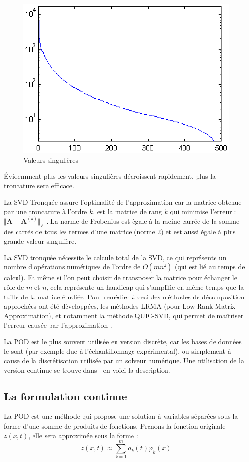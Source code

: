 \documentclass[12pt,a4paper]{report}
\begin{document}
\begin{figure}[!ht]
\centering
\includegraphics[width=0.425\linewidth]{Images/SVD/Valeurs.Singulieres.Semilog.eps}
\caption{Valeurs singulières}
\end{figure}

\label{ValeursSing}
Évidemment plus les valeurs singulières décroissent rapidement, plus la troncature sera efficace. 

La SVD Tronquée assure l'optimalité de l'approximation car la matrice obtenue par une troncature à l'ordre $k$, est la matrice de rang $k$ qui minimise l'erreur : $  \Vert \mathbf{A} - \mathbf{A}^{(k)} \Vert_F$ . La norme de Frobenius est égale à la racine carrée de la somme des carrés de tous les termes d'une matrice (norme 2) et est aussi égale à plus grande valeur singulière. 

La SVD tronquée nécessite le calcule total de la SVD, ce qui représente un nombre d'opérations numériques de l'ordre de $O(mn^2)$ (qui est lié au temps de calcul). Et même si l'on peut choisir de transposer la matrice pour échanger le rôle de $m$ et $n$, cela représente un handicap qui s'amplifie en même temps que la taille de la matrice étudiée. Pour remédier à ceci des méthodes de décomposition approchées ont été développées, les méthodes LRMA (pour Low-Rank Matrix Approximation), et notamment la méthode QUIC-SVD, qui permet de maîtriser l'erreur causée par l'approximation \cite{QUIC-SVD}. 

La POD est le plus souvent utilisée en version discrète, car les bases de données le sont (par exemple due à l'échantillonnage expérimental), ou simplement à cause de la discrétisation utilisée par un solveur numérique. Une utilisation de la version continue se trouve dans \cite{Turbulence}, en voici la description.

\subsection{La formulation continue}
La POD est une méthode qui propose une solution à variables séparées sous la forme d'une somme de produits de fonctions. Prenons la fonction originale $z(x,t)$, elle sera approximée sous la forme :
\begin{equation}
\label{DecompoPOD}
z(x,t) \approx \sum_{k=1}^m a_k(t) \varphi_k(x)
\end{equation}
\end{document}
